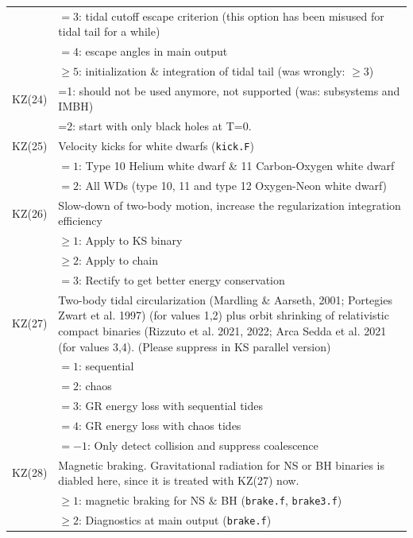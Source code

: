 \begin{longtable}{@{}p{1.5cm}p{13.0cm}}
        & $=3$: tidal cutoff escape criterion (this option has been misused for tidal tail for a while) \\
        & $=4$: escape angles in main output \\
        & $\ge 5$: initialization \& integration of tidal tail (was wrongly: $\ge 3$)\\
KZ(24)  & =1: should not be used anymore, not supported (was: subsystems and IMBH)\\
        & =2: start with only black holes at T=0. \\
KZ(25)  & Velocity kicks for white dwarfs (\texttt{kick.F}) \\
        & $=1$: Type 10 Helium white dwarf \& 11 Carbon-Oxygen white dwarf \\
        & $=2$: All WDs (type 10, 11 and type 12 Oxygen-Neon white dwarf) \\
KZ(26)  & Slow-down of two-body motion, increase the regularization integration efficiency \\
        & $\ge 1$: Apply to KS binary \\
        & $\ge 2$: Apply to chain \\
        & $=3$: Rectify to get better energy conservation \\
KZ(27)  & Two-body tidal circularization (Mardling \& Aarseth, 2001; Portegies Zwart et al. 1997) (for values 1,2) plus orbit shrinking of relativistic compact binaries (Rizzuto et al. 2021, 2022; Arca Sedda et al. 2021 (for values 3,4).
        (Please suppress in KS parallel version) \\
        & $=1$: sequential  \\
        & $=2$: chaos \\
        & $=3$: GR energy loss with sequential tides\\
        & $=4$: GR energy loss with chaos tides \\
        & $=-1$: Only detect collision and suppress coalescence \\
KZ(28)  & Magnetic braking. Gravitational radiation for NS or BH binaries is diabled here, since it is treated with KZ(27) now. \\
        & $\ge 1$: magnetic braking for NS \& BH (\texttt{brake.f}, \texttt{brake3.f})\\
        & $\ge 2$: Diagnostics at main output (\texttt{brake.f}) \\

\end{longtable}
